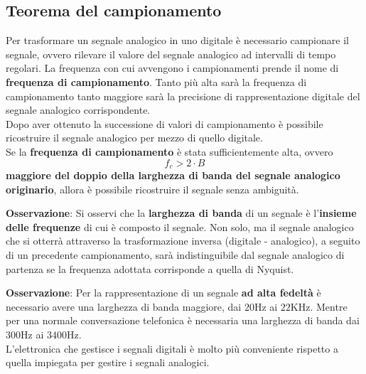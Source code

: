 \documentclass[a4paper]{extarticle}
\begin{document}
\subsection{Teorema del campionamento}
Per trasformare un segnale analogico in uno digitale è necessario campionare il segnale, ovvero rilevare il valore del segnale analogico ad intervalli di tempo regolari. La frequenza con cui avvengono i campionamenti prende il nome di \textbf{frequenza di campionamento}. Tanto più alta sarà la frequenza di campionamento tanto maggiore sarà la precisione di rappresentazione digitale del segnale analogico corrispondente.\\
Dopo aver ottenuto la successione di valori di campionamento è possibile ricostruire il segnale analogico per mezzo di quello digitale.\\
Se la \textbf{frequenza di campionamento} è stata sufficientemente alta, ovvero
\[f_c > 2 \cdot B\]
\textbf{maggiore del doppio della larghezza di banda del segnale analogico originario}, allora è possibile ricostruire il segnale senza ambiguità.

\vspace{1em}
\noindent
\textbf{Osservazione}: Si osservi che la \textbf{larghezza di banda} di un segnale è l'\textbf{insieme delle frequenze} di cui è composto il segnale. Non solo, ma il segnale analogico che si otterrà attraverso la trasformazione inversa (digitale - analogico), a seguito di un precedente campionamento, sarà indistinguibile dal segnale analogico di partenza se la frequenza adottata corrisponde a quella di Nyquist.

\vspace{1em}
\noindent
\textbf{Osservazione}: Per la rappresentazione di un segnale \textbf{ad alta fedeltà} è necessario avere una larghezza di banda maggiore, dai \(20\)Hz ai \(22\)KHz. Mentre per una normale conversazione telefonica è necessaria una larghezza di banda dai \(300\)Hz ai \(3400\)Hz.\\
L'elettronica che gestisce i segnali digitali è molto più conveniente rispetto a quella impiegata per gestire i segnali analogici.
\end{document}
